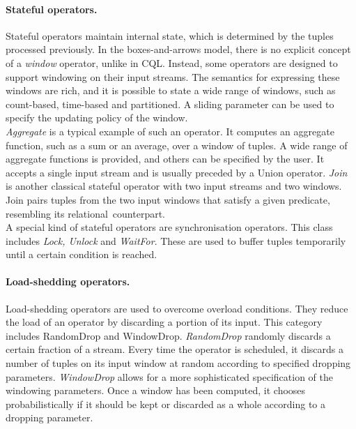\paragraph{Stateful operators.} Stateful operators maintain internal state, which is determined by the
tuples processed previously. 
In the boxes-and-arrows model, there is no explicit concept of a \emph{window} operator, unlike in CQL.
Instead, some operators are designed to support windowing on their input streams. The semantics for
expressing these windows are rich, and it is possible to state a wide range of windows, such as
count-based, time-based and partitioned. A sliding parameter can be used to specify the updating policy
of the window.\\
\emph{Aggregate} is a typical example of such an operator. It computes an aggregate function, such as a
sum or an average, over a window of tuples. A wide range of aggregate functions is provided, and others
can be specified by the user. It accepts a single input stream and is usually preceded by a Union operator. 
\emph{Join} is another classical stateful operator with two input streams and two windows. Join pairs
tuples from the two input windows that satisfy a given predicate, resembling its
relational~counterpart.\\
A special kind of stateful operators are synchronisation operators. This class includes \emph{Lock,
Unlock} and \emph{WaitFor}. These are used to buffer tuples temporarily until a certain condition is
reached.
\vsp
\paragraph{\mbox{Load-shedding} operators.} Load-shedding operators are used to overcome overload
conditions. They reduce the load of an operator by discarding a portion of its input. This category includes RandomDrop and
WindowDrop. \emph{RandomDrop} randomly discards a certain fraction of a stream. Every time the operator
is scheduled, it discards a number of tuples on its input window at random according to specified
dropping parameters. \emph{WindowDrop} allows for a more sophisticated specification of the windowing
parameters. Once a window has been computed, it chooses probabilistically if it should be kept or
discarded as a whole according to a dropping parameter.\\

